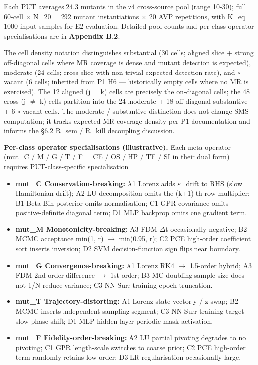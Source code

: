 \documentclass[review,12pt,authoryear]{elsarticle}
\providecommand{\tightlist}{\setlength{\itemsep}{0pt}\setlength{\parskip}{0pt}}
\begin{document}
Each PUT averages 24.3 mutants in the v4 cross-source pool (range
10-30); full 60-cell $\times$ N=20 = 292 mutant instantiations $\times$ 20 AVP
repetitions, with K\_eq = 1000 input samples for E2 evaluation. Detailed
pool counts and per-class operator specialisations are in
\textbf{Appendix B.2}.

The cell density notation distinguishes \textbullet\textbullet substantial (30 cells;
aligned slice + strong off-diagonal cells where MR coverage is dense and
mutant detection is expected), \textbullet moderate (24 cells; cross slice with
non-trivial expected detection rate), and $\circ$ vacant (6 cells; inherited
from P1 H6 --- historically empty cells where no MR is exercised). The
12 aligned (j = k) cells are precisely the on-diagonal cells; the 48
cross (j $\neq$ k) cells partition into the 24 \textbullet moderate + 18 \textbullet\textbullet
off-diagonal substantive + 6 $\circ$ vacant cells. The \textbullet moderate / \textbullet\textbullet
substantive distinction does not change SMS computation; it tracks
expected MR coverage density per P1 documentation and informs the §6.2
R\_sem / R\_kill decoupling discussion.

\textbf{Per-class operator specialisations (illustrative).} Each
meta-operator (mut\_C / M / G / T / F = CE / OS / HP / TF / SI in their
dual form) requires PUT-class-specific specialisation:

\begin{itemize}
\tightlist
\item
  \textbf{mut\_C Conservation-breaking:} A1 Lorenz adds $\varepsilon$\_drift to RHS
  (slow Hamiltonian drift); A2 LU decomposition omits the (k+1)-th row
  multiplier; B1 Beta-Bin posterior omits normalisation; C1 GPR
  covariance omits positive-definite diagonal term; D1 MLP backprop
  omits one gradient term.
\item
  \textbf{mut\_M Monotonicity-breaking:} A3 FDM $\Delta$t occasionally
  negative; B2 MCMC acceptance min(1, r) $\to$ min(0.95, r); C2 PCE
  high-order coefficient sort inserts inversion; D2 SVM
  decision-function sign flips near boundary.
\item
  \textbf{mut\_G Convergence-breaking:} A1 Lorenz RK4 $\to$ 1.5-order
  hybrid; A3 FDM 2nd-order difference $\to$ 1st-order; B3 MC doubling sample
  size does not 1/N-reduce variance; C3 NN-Surr training-epoch
  truncation.
\item
  \textbf{mut\_T Trajectory-distorting:} A1 Lorenz state-vector y / z
  swap; B2 MCMC inserts independent-sampling segment; C3 NN-Surr
  training-target slow phase shift; D1 MLP hidden-layer periodic-mask
  activation.
\item
  \textbf{mut\_F Fidelity-order-breaking:} A2 LU partial pivoting
  degrades to no pivoting; C1 GPR length-scale switches to coarse prior;
  C2 PCE high-order term randomly retains low-order; D3 LR
  regularisation occasionally large.
\end{itemize}
\end{document}
